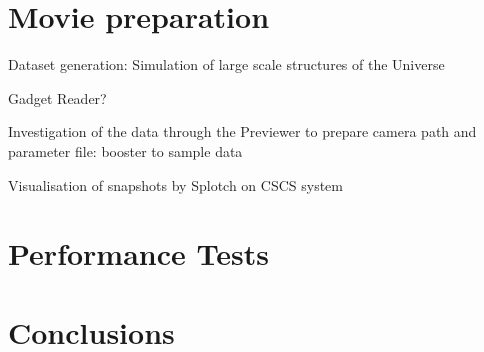 \documentclass{egpubl}
\begin{document}
\section{Movie preparation}

Dataset generation: Simulation of large scale structures of the Universe

Gadget Reader?

Investigation of the data through the Previewer to prepare camera path and parameter file:
booster to sample data

Visualisation of snapshots by Splotch on CSCS system

\section{Performance Tests}


 

\section{Conclusions}

 


%



\end{document}
